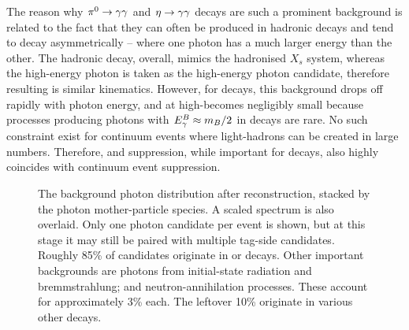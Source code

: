 The reason why $\pi^0\rightarrow\gamma\gamma$ and $\eta\rightarrow\gamma\gamma$ decays are such a prominent background is related to the fact that they can often be produced in hadronic decays and tend to decay asymmetrically -- where one photon has a much larger energy than the other.
The hadronic decay, overall, mimics the hadronised $X_s$ system, whereas the high-energy photon is taken as the high-energy photon candidate, therefore resulting is similar kinematics.
However, for \B decays, this background drops off rapidly with photon energy, and at high-\EB becomes negligibly small because processes producing photons with ${E^B_{\gamma}}\approx m_B/2$ in \B decays are rare.
No such constraint exist for continuum events where light-hadrons can be created in large numbers.
Therefore, \piz and \eta suppression, while important for \B decays, also highly coincides with continuum event suppression.

\begin{figure}[htbp!]
    \centering
    \caption{\label{fig:photon_sources} The background photon distribution after reconstruction, stacked by the photon mother-particle species.
    A scaled \BtoXsgamma spectrum is also overlaid.
    Only one photon candidate per event is shown, but at this stage it may still be paired with multiple tag-side candidates.
    Roughly 85\% of candidates originate in \pi\ra\g\g or \eta\ra\g\g decays.
    Other important backgrounds are photons from initial-state radiation and bremmstrahlung; and neutron-annihilation processes.
    These account for approximately 3\% each.
    The leftover 10\% originate in various other decays.}
\end{figure}

